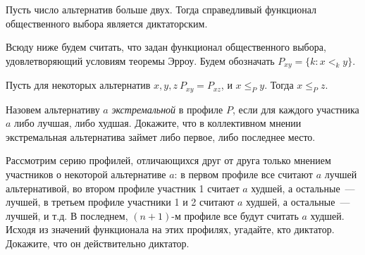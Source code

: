 \documentclass[a4paper,12pt]{article}
\begin{document}
 Пусть число альтернатив
больше двух. Тогда справедливый функционал общественного выбора
является диктаторским.

\smallskip

Всюду ниже будем считать, что задан функционал общественного выбора,
удовлетворяющий условиям теоремы Эрроу. Будем обозначать $P_{xy} =
\{k: x <_k y\}$.

 Пусть для некоторых альтернатив
$x,y,z \ P_{xy} = P_{xz}$, и $x \leq_P y$. Тогда $x \leq_P z$.

 Назовем альтернативу
$a$ {\em экстремальной} в профиле $P$, если для каждого участника
$a$ либо лучшая, либо худшая. Докажите, что в коллективном мнении
экстремальная альтернатива займет либо первое, либо последнее место.

 Рассмотрим серию профилей,
отличающихся друг от друга только мнением участников о некоторой
альтернативе $a$: в первом профиле все считают $a$ лучшей
альтернативой, во втором профиле участник 1 считает $a$ худшей, а
остальные~--- лучшей, в третьем профиле участники 1 и 2 считают $a$
худшей, а остальные~--- лучшей, и т.д. В последнем, $(n + 1)$-м
профиле все будут считать $a$ худшей.   Исходя из
значений функционала на этих профилях, угадайте, кто диктатор.
 Докажите, что он действительно диктатор.
\end{document}
